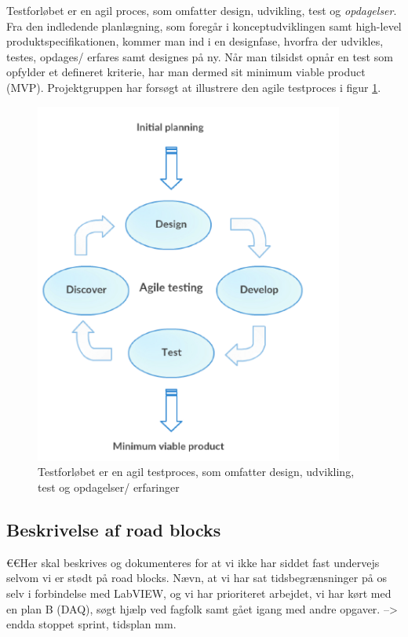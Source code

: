 Testforløbet er en agil proces, som omfatter design, udvikling, test og \textit{opdagelser}. Fra den indledende planlægning, som foregår i konceptudviklingen samt high-level produktspecifikationen, kommer man ind i en designfase, hvorfra der udvikles, testes, opdages/ erfares samt designes på ny. Når man tilsidst opnår en test som opfylder et defineret kriterie, har man dermed sit minimum viable product (MVP). Projektgruppen har forsøgt at illustrere den agile testproces i figur \ref{fig:agiletesting}. 

		\begin{figure}[htb]
			\centering
				\includegraphics[width=4in]{AgileTesting}
				\caption{Testforløbet er en agil testproces, som omfatter design, udvikling, test og opdagelser/ erfaringer}
				\label{fig:agiletesting}
			\end{figure}
 

\subsection{Beskrivelse af road blocks}

€€Her skal beskrives og dokumenteres for at vi ikke har siddet fast undervejs selvom vi er stødt på road blocks. 
Nævn, at vi har sat tidsbegrænsninger på os selv i forbindelse med LabVIEW, og vi har prioriteret arbejdet, vi har kørt med en plan B (DAQ), søgt hjælp ved fagfolk samt gået igang med andre opgaver. --> endda stoppet sprint, tidsplan mm. 

